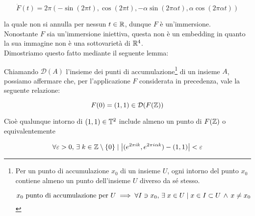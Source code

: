 \begin{equation}
	\dot{F}(t) = 2 \pi (- \sin(2 \pi t), \cos(2 \pi t), - \alpha \sin(2 \pi \alpha t), \alpha \cos(2 \pi \alpha t))
\end{equation}

la quale non si annulla per nessun $ t \in \mathbb{R} $, dunque $ F $ è un'immersione. \\
Nonostante $ F $ sia un'immersione iniettiva, questa non è un embedding in quanto la sua immagine non è una sottovarietà di $ \mathbb{R}^{4} $. \\
Dimostriamo questo fatto mediante il seguente lemma:

\begin{lemma}
	Chiamando $ \mathcal{D}(A) $ l'insieme dei punti di accumulazione\footnote{%
		Per un punto di accumulazione $ x_{0} $ di un insieme $ U $, ogni intorno del punto $ x_{0} $ contiene almeno un punto dell'insieme $ U $ diverso da sé stesso.
		
		\begin{equation}
			x_{0} \text{ punto di accumulazione per } U %
			\implies %
			\forall I \ni x_{0}, \, \E x \in U \mid x \in I \subset U \, \wedge \, x \neq x_{0}
		\end{equation} %
	} di un insieme $ A $, possiamo affermare che, per l'applicazione $ F $ considerata in precedenza, vale la seguente relazione:
	
	\begin{equation}
		F(0) = (1,1) \in \mathcal{D}(F(\mathbb{Z}))
	\end{equation}

	Cioè qualunque intorno di $ (1,1) \in \mathbb{T}^{2} $ include almeno un punto di $ F(\mathbb{Z}) $ o equivalentemente
	
	\begin{equation}
		\forall \varepsilon > 0, \, \exists \; k \in \mathbb{Z} \setminus \{0\} \mid \left| (e^{2 \pi i k}, e^{2 \pi i \alpha k}) - (1,1) \right| < \varepsilon
	\end{equation}
\end{lemma}


